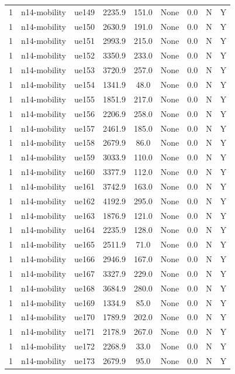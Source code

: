 \begin{table}[ht]
\begin{tabular}{|c|c|c|c|c|c|c|c|c|}
1 & n14-mobility & ue149 & 2235.9 & 151.0 & None & 0.0 & N & Y \\
1 & n14-mobility & ue150 & 2630.9 & 191.0 & None & 0.0 & N & Y \\
1 & n14-mobility & ue151 & 2993.9 & 215.0 & None & 0.0 & N & Y \\
1 & n14-mobility & ue152 & 3350.9 & 233.0 & None & 0.0 & N & Y \\
1 & n14-mobility & ue153 & 3720.9 & 257.0 & None & 0.0 & N & Y \\
1 & n14-mobility & ue154 & 1341.9 & 48.0 & None & 0.0 & N & Y \\
1 & n14-mobility & ue155 & 1851.9 & 217.0 & None & 0.0 & N & Y \\
1 & n14-mobility & ue156 & 2206.9 & 258.0 & None & 0.0 & N & Y \\
1 & n14-mobility & ue157 & 2461.9 & 185.0 & None & 0.0 & N & Y \\
1 & n14-mobility & ue158 & 2679.9 & 86.0 & None & 0.0 & N & Y \\
1 & n14-mobility & ue159 & 3033.9 & 110.0 & None & 0.0 & N & Y \\
1 & n14-mobility & ue160 & 3377.9 & 112.0 & None & 0.0 & N & Y \\
1 & n14-mobility & ue161 & 3742.9 & 163.0 & None & 0.0 & N & Y \\
1 & n14-mobility & ue162 & 4192.9 & 295.0 & None & 0.0 & N & Y \\
1 & n14-mobility & ue163 & 1876.9 & 121.0 & None & 0.0 & N & Y \\
1 & n14-mobility & ue164 & 2235.9 & 128.0 & None & 0.0 & N & Y \\
1 & n14-mobility & ue165 & 2511.9 & 71.0 & None & 0.0 & N & Y \\
1 & n14-mobility & ue166 & 2946.9 & 167.0 & None & 0.0 & N & Y \\
1 & n14-mobility & ue167 & 3327.9 & 229.0 & None & 0.0 & N & Y \\
1 & n14-mobility & ue168 & 3684.9 & 280.0 & None & 0.0 & N & Y \\
1 & n14-mobility & ue169 & 1334.9 & 85.0 & None & 0.0 & N & Y \\
1 & n14-mobility & ue170 & 1789.9 & 202.0 & None & 0.0 & N & Y \\
1 & n14-mobility & ue171 & 2178.9 & 267.0 & None & 0.0 & N & Y \\
1 & n14-mobility & ue172 & 2268.9 & 33.0 & None & 0.0 & N & Y \\
1 & n14-mobility & ue173 & 2679.9 & 95.0 & None & 0.0 & N & Y \\

\end{tabular}
\end{table}
